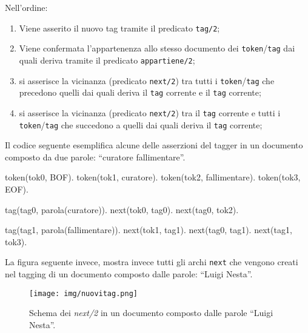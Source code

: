 Nell'ordine:
\begin{enumerate}
\item Viene asserito il nuovo tag tramite il predicato \verb|tag/2|;
\item Viene confermata l'appartenenza allo stesso documento dei \verb|token|/\verb|tag| dai quali deriva tramite il predicato \verb|appartiene/2|;
\item si asserisce la vicinanza (predicato \verb|next/2|) tra tutti i \verb|token|/\verb|tag| che precedono quelli dai quali deriva il \verb|tag| corrente e il \verb|tag| corrente;
\item si asserisce la vicinanza (predicato \verb|next/2|) tra il \verb|tag| corrente e tutti i \verb|token|/\verb|tag| che succedono a quelli dai quali deriva il \verb|tag| corrente;
\end{enumerate} 

Il codice seguente esemplifica alcune delle asserzioni del tagger in un documento composto da due parole: ``curatore fallimentare''.

\begin{prologcode}
token(tok0, BOF).
token(tok1, curatore).
token(tok2, fallimentare).
token(tok3, EOF).

tag(tag0, parola(curatore)).
next(tok0, tag0).
next(tag0, tok2).

tag(tag1, parola(fallimentare)).
next(tok1, tag1).
next(tag0, tag1).
next(tag1, tok3).
\end{prologcode}

La figura seguente invece, mostra invece tutti gli archi \verb|next| che vengono creati nel tagging di un documento composto dalle parole: ``Luigi Nesta''.

\begin{figure}[H]
\centering
\texttt{[image: img/nuovitag.png]}
\label{fig:nuovitag}
\caption[Esempio di ``next'']{Schema dei \emph{next/2} in un documento composto dalle parole ``Luigi Nesta''.}
\end{figure}
